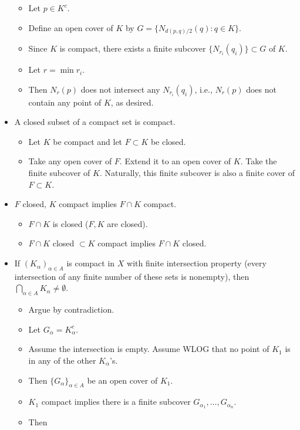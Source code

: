 \documentclass[../../notes.tex]{subfiles}
\begin{document}
\begin{itemize}
\begin{itemize}
        \item Let $p\in K^c$.
        \item Define an open cover of $K$ by $G=\{N_{d(p,q)/2}(q):q\in K\}$.
        \item Since $K$ is compact, there exists a finite subcover $\{N_{r_i}(q_i)\}\subset G$ of $K$.
        \item Let $r=\min r_i$.
        \item Then $N_r(p)$ does not intersect any $N_{r_i}(q_i)$, i.e., $N_r(p)$ does not contain any point of $K$, as desired.
    \end{itemize}
    \item A closed subset of a compact set is compact.
    \begin{itemize}
        \item Let $K$ be compact and let $F\subset K$ be closed.
        \item Take any open cover of $F$. Extend it to an open cover of $K$. Take the finite subcover of $K$. Naturally, this finite subcover is also a finite cover of $F\subset K$.
    \end{itemize}
    \item $F$ closed, $K$ compact implies $F\cap K$ compact.
    \begin{itemize}
        \item $F\cap K$ is closed ($F,K$ are closed).
        \item $F\cap K$ closed $\subset K$ compact implies $F\cap K$ closed.
    \end{itemize}
    \item If $(K_\alpha)_{\alpha\in A}$ is compact in $X$ with finite intersection property (every intersection of any finite number of these sets is nonempty), then $\bigcap_{\alpha\in A}K_\alpha\neq\emptyset$.
    \begin{itemize}
        \item Argue by contradiction.
        \item Let $G_\alpha=K_\alpha^c$.
        \item Assume the intersection is empty. Assume WLOG that no point of $K_1$ is in any of the other $K_\alpha$'s.
        \item Then $\{G_\alpha\}_{\alpha\in A}$ be an open cover of $K_1$.
        \item $K_1$ compact implies there is a finite subcover $G_{\alpha_1},\dots,G_{\alpha_n}$.
        \item Then
        \begin{equation*}

\end{equation*}
\end{itemize}
\end{itemize}
\end{document}
